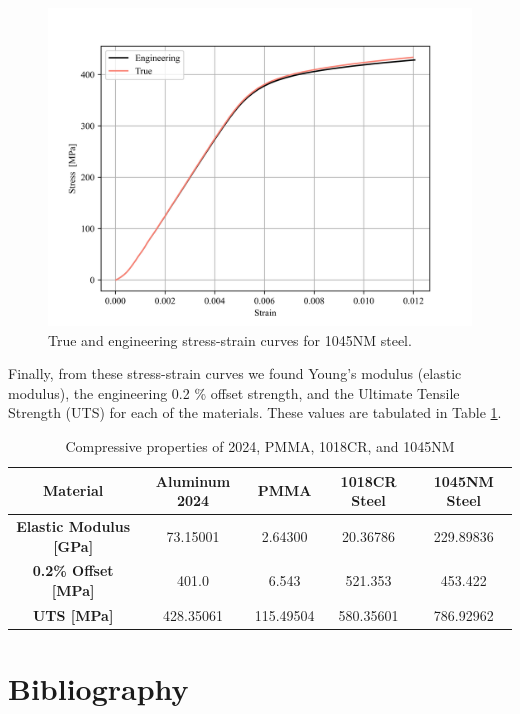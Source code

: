\documentclass{article}
\begin{document}
\begin{figure}[!h!]
    \centering
    \includegraphics[width=0.7\linewidth]{plots/q3_engvtru.png}
    \caption{True and engineering stress-strain curves for 1045NM steel.}
    \label{fig:evt}
\end{figure}

Finally, from these stress-strain curves we found Young's modulus (elastic modulus), the engineering 0.2 \% offset strength, and the Ultimate Tensile Strength (UTS) for each of the materials. These values are tabulated in Table \ref{tab:q4}.

\begin{table}[!h!]
    \centering
    \def\arraystretch{1.5}
    \caption{Compressive properties of 2024, PMMA, 1018CR, and 1045NM}
    \begin{tabular}{|c|c|c|c|c|}
         \toprule
         \hline
         \textbf{Material} & \textbf{Aluminum 2024} & \textbf{PMMA} & \textbf{1018CR Steel} & \textbf{1045NM Steel}  \\
         \midrule
         \textbf{Elastic Modulus [GPa]} & 73.15001 & 2.64300 & 20.36786 & 229.89836 \\
         \hline
         \textbf{0.2\% Offset [MPa]} & 401.0 & 6.543 & 521.353 & 453.422\\
         \hline
         \textbf{UTS [MPa]} & 428.35061 & 115.49504 & 580.35601 & 786.92962 \\
         \bottomrule
    \end{tabular}
    
    \label{tab:q4}
\end{table}

\newpage
\section{Bibliography}
\printbibliography[heading=none]
\end{document}
